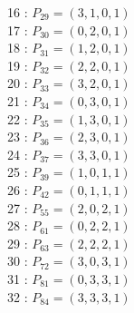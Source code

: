 \documentclass{article}
\begin{document}
{\begin{multicols}{3}
16 : $P_{29}=( 3, 1, 0, 1 )$\\
17 : $P_{30}=( 0, 2, 0, 1 )$\\
18 : $P_{31}=( 1, 2, 0, 1 )$\\
19 : $P_{32}=( 2, 2, 0, 1 )$\\
20 : $P_{33}=( 3, 2, 0, 1 )$\\
21 : $P_{34}=( 0, 3, 0, 1 )$\\
22 : $P_{35}=( 1, 3, 0, 1 )$\\
23 : $P_{36}=( 2, 3, 0, 1 )$\\
24 : $P_{37}=( 3, 3, 0, 1 )$\\
25 : $P_{39}=( 1, 0, 1, 1 )$\\
26 : $P_{42}=( 0, 1, 1, 1 )$\\
27 : $P_{55}=( 2, 0, 2, 1 )$\\
28 : $P_{61}=( 0, 2, 2, 1 )$\\
29 : $P_{63}=( 2, 2, 2, 1 )$\\
30 : $P_{72}=( 3, 0, 3, 1 )$\\
31 : $P_{81}=( 0, 3, 3, 1 )$\\
32 : $P_{84}=( 3, 3, 3, 1 )$\\
\end{multicols}


%


%


}%
\end{document}
